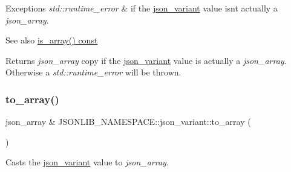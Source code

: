 \begin{DoxyExceptions}{Exceptions}
{\em std\+::runtime\+\_\+error} & if the \hyperlink{classJSONLIB__NAMESPACE_1_1json__variant}{json\+\_\+variant} value isn\textquotesingle{}t actually a {\itshape json\+\_\+array}. \\
\hline
\end{DoxyExceptions}
\begin{DoxySeeAlso}{See also}
\hyperlink{classJSONLIB__NAMESPACE_1_1json__variant_a72349dff71a411ac24eea6d943772df7}{is\+\_\+array() const} 
\end{DoxySeeAlso}
\begin{DoxyReturn}{Returns}
{\itshape json\+\_\+array} copy if the \hyperlink{classJSONLIB__NAMESPACE_1_1json__variant}{json\+\_\+variant} value is actually a {\itshape json\+\_\+array}. Otherwise a {\itshape std\+::runtime\+\_\+error} will be thrown. 
\end{DoxyReturn}
\mbox{\label{classJSONLIB__NAMESPACE_1_1json__variant_a2af42a0f5c2fb4a8a74d2cae1166752a}} 
\subsubsection{\texorpdfstring{to\+\_\+array()}{to\_array()}\hspace{0.1cm}{\footnotesize\ttfamily [2/4]}}
{\footnotesize\ttfamily json\+\_\+array \& J\+S\+O\+N\+L\+I\+B\+\_\+\+N\+A\+M\+E\+S\+P\+A\+C\+E\+::json\+\_\+variant\+::to\+\_\+array (\begin{DoxyParamCaption}{ }\end{DoxyParamCaption})}



Casts the \hyperlink{classJSONLIB__NAMESPACE_1_1json__variant}{json\+\_\+variant} value to {\itshape json\+\_\+array}. 


